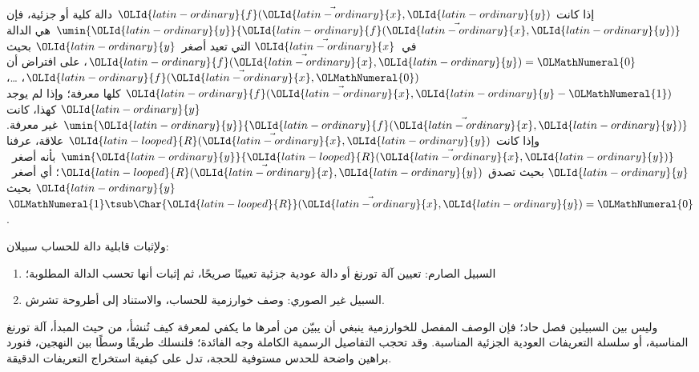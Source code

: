 \documentclass[../../../include/open-logic-section]{subfiles}
\begin{document}
إذا كانت ${\OLId{latin-ordinary}{f}}(\vec {\OLId{latin-ordinary}{x}},{\OLId{latin-ordinary}{y}})$ دالة كلية أو جزئية، فإن
$\umin{{\OLId{latin-ordinary}{y}}}{{\OLId{latin-ordinary}{f}}(\vec {\OLId{latin-ordinary}{x}},{\OLId{latin-ordinary}{y}})}$ هي الدالة في~$\vec {\OLId{latin-ordinary}{x}}$ التي تعيد أصغر~${\OLId{latin-ordinary}{y}}$
بحيث ${\OLId{latin-ordinary}{f}}(\vec {\OLId{latin-ordinary}{x}},{\OLId{latin-ordinary}{y}})={\OLMathNumeral{0}}$، على افتراض أن ${\OLId{latin-ordinary}{f}}(\vec {\OLId{latin-ordinary}{x}},{\OLMathNumeral{0}})$، …،
${\OLId{latin-ordinary}{f}}(\vec {\OLId{latin-ordinary}{x}},{\OLId{latin-ordinary}{y}}-{\OLMathNumeral{1}})$ كلها معرفة؛ وإذا لم يوجد ${\OLId{latin-ordinary}{y}}$ كهذا، كانت
$\umin{{\OLId{latin-ordinary}{y}}}{{\OLId{latin-ordinary}{f}}(\vec {\OLId{latin-ordinary}{x}},{\OLId{latin-ordinary}{y}})}$ غير معرفة. وإذا كانت ${\OLId{latin-looped}{R}}(\vec {\OLId{latin-ordinary}{x}},{\OLId{latin-ordinary}{y}})$ علاقة،
عرفنا $\umin{{\OLId{latin-ordinary}{y}}}{{\OLId{latin-looped}{R}}(\vec {\OLId{latin-ordinary}{x}},{\OLId{latin-ordinary}{y}})}$ بأنه أصغر~${\OLId{latin-ordinary}{y}}$ بحيث تصدق
${\OLId{latin-looped}{R}}(\vec {\OLId{latin-ordinary}{x}},{\OLId{latin-ordinary}{y}})$؛ أي أصغر~${\OLId{latin-ordinary}{y}}$ بحيث ${\OLMathNumeral{1}}\tsub\Char{{\OLId{latin-looped}{R}}}(\vec {\OLId{latin-ordinary}{x}},{\OLId{latin-ordinary}{y}})={\OLMathNumeral{0}}$.

ولإثبات قابلية دالة للحساب سبيلان:
\begin{enumerate}
\item السبيل الصارم: تعيين آلة تورنغ أو دالة عودية جزئية تعيينًا صريحًا،
  ثم إثبات أنها تحسب الدالة المطلوبة؛
\item السبيل غير الصوري: وصف خوارزمية للحساب، والاستناد إلى أطروحة تشرش.
\end{enumerate}
وليس بين السبيلين فصل حاد؛ فإن الوصف المفصل للخوارزمية ينبغي أن يبيّن
من أمرها ما يكفي لمعرفة كيف تُنشأ، من حيث المبدأ، آلة
تورنغ المناسبة، أو سلسلة التعريفات العودية الجزئية المناسبة. وقد تحجب
التفاصيل الرسمية الكاملة وجه الفائدة؛ فلنسلك طريقًا وسطًا بين
النهجين، فنورد براهين واضحة للحدس مستوفية للحجة، تدل على كيفية استخراج
التعريفات الدقيقة.
\end{document}
